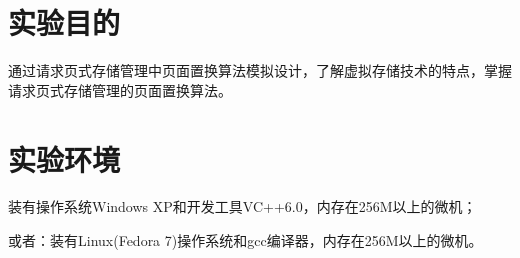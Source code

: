 \documentclass[c5size,a4paper,nofonts]{ctexart}
\begin{document}

\setcounter{part}{4}


\section{实验目的}
通过请求页式存储管理中页面置换算法模拟设计，了解虚拟存储技术的特点，掌握请求页式存储管理的页面置换算法。

\section{实验环境}
装有操作系统Windows XP和开发工具VC++6.0，内存在256M以上的微机；

或者：装有Linux(Fedora 7)操作系统和gcc编译器，内存在256M以上的微机。
\end{document}

